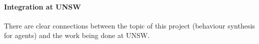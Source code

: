 \documentclass[a4paper,12pt,smallheadings]{scrartcl}
\newcommand\aside[1]{\textcolor{red}{#1}}
\begin{document}

 

\paragraph{Integration at UNSW}

There are clear connections between the topic of this project (behaviour synthesis for agents) and the work 
being done at UNSW. 

\end{document}
